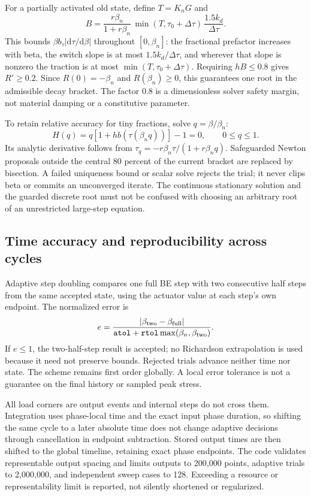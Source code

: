 \documentclass[11pt,a4paper]{article}
\newcommand{\dd}{\mathrm{d}}
\newcommand{\code}[1]{\texttt{\detokenize{#1}}}
\begin{document}
For a partially activated old state, define $T=K_nG$ and
\begin{equation}
 B=\frac{r\beta_n}{1+r\beta_n}\,
       \min(T,\tau_0+\Delta\tau)\,\frac{1.5k_d}{\Delta\tau}.
 \label{eq:bound}
\end{equation}
This bounds $\beta b_\tau|\dd\tau/\dd\beta|$ throughout $[0,\beta_n]$:
the fractional prefactor increases with beta, the switch slope is at most
$1.5k_d/\Delta\tau$, and wherever that slope is nonzero the traction is at
most $\min(T,\tau_0+\Delta\tau)$. Requiring $hB\leq0.8$ gives
$R'\geq0.2$. Since $R(0)=-\beta_n$ and $R(\beta_n)\geq0$, this guarantees
one root in the admissible decay bracket. The factor $0.8$ is a dimensionless
solver safety margin, not material damping or a constitutive parameter.

To retain relative accuracy for tiny fractions, solve $q=\beta/\beta_n$:
\begin{equation}
 H(q)=q[1+h b(\tau(\beta_nq))]-1=0,\qquad 0\leq q\leq1.
\end{equation}
Its analytic derivative follows from
$\tau_q=-r\beta_n\tau/(1+r\beta_nq)$. Safeguarded Newton proposals outside
the central 80 percent of the current bracket are replaced by bisection.
A failed uniqueness bound or scalar solve rejects the trial; it never clips
beta or commits an unconverged iterate. The continuous stationary solution
and the guarded discrete root must not be confused with choosing an arbitrary
root of an unrestricted large-step equation.

\subsection{Time accuracy and reproducibility across cycles}

Adaptive step doubling compares one full BE step with two consecutive half
steps from the same accepted state, using the actuator value at each step's
own endpoint. The normalized error is
\begin{equation}
 e=\frac{|\beta_{\mathrm{two}}-\beta_{\mathrm{full}}|}
 {\code{atol}+\code{rtol}\max(\beta_n,\beta_{\mathrm{two}})}.
\end{equation}
If $e\leq1$, the two-half-step result is accepted; no Richardson extrapolation
is used because it need not preserve bounds. Rejected trials advance neither
time nor state. The scheme remains first order globally. A local error
tolerance is not a guarantee on the final history or sampled peak stress.

All load corners are output events and internal steps do not cross them.
Integration uses phase-local time and the exact input phase duration, so
shifting the same cycle to a later absolute time does not change adaptive
decisions through cancellation in endpoint subtraction. Stored output times
are then shifted to the global timeline, retaining exact phase endpoints.
The code validates representable output spacing and limits outputs to 200,000
points, adaptive trials to 2,000,000, and independent sweep cases to 128.
Exceeding a resource or representability limit is reported, not silently
shortened or regularized.
\end{document}
